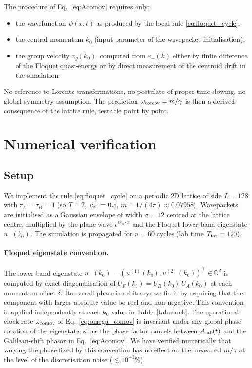 \documentclass[11pt,a4paper]{article}
\begin{document}
The procedure of Eq.~\eqref{eq:Acomov} requires only:
\begin{itemize}
\item the wavefunction $\psi(x, t)$ as produced by the local
rule \eqref{eq:floquet_cycle},
\item the central momentum $k_0$ (input parameter of the
wavepacket initialisation),
\item the group velocity $v_g(k_0)$, computed from
$\varepsilon_-(k)$ either by finite difference of the Floquet
quasi-energy or by direct measurement of the centroid drift in
the simulation.
\end{itemize}
No reference to Lorentz transformations, no postulate of
proper-time slowing, no global symmetry assumption. The
prediction $\omega_{\rm comov} = m/\gamma$ is then a derived
consequence of the lattice rule, testable point by point.

\section{Numerical verification}
\label{sec:numerical}

\subsection{Setup}

We implement the rule \eqref{eq:floquet_cycle} on a periodic
2D lattice of side $L = 128$ with $\tau_A = \tau_B = 1$ (so
$T = 2$, $c_{\rm eff} = 0.5$, $m = 1/(4\pi) \approx 0.07958$).
Wavepackets are initialised as a Gaussian envelope of width
$\sigma = 12$ centred at the lattice centre, multiplied by the
plane wave $e^{i k_0 \cdot x}$ and the Floquet lower-band
eigenstate $u_-(k_0)$. The simulation is propagated for
$n = 60$ cycles (lab time $T_{\rm tot} = 120$).

\paragraph{Floquet eigenstate convention.}
The lower-band eigenstate $u_-(k_0) = (u_-^{(1)}(k_0),
u_-^{(2)}(k_0))^\top \in \mathbb{C}^2$ is computed by exact
diagonalisation of $U_F(k_0) = U_B(k_0)\,U_A(k_0)$ at each
momentum offset $\delta$. Its overall phase is arbitrary; we
fix it by requiring that the component with larger absolute
value be real and non-negative. This convention is applied
independently at each $k_0$ value in
Table~\ref{tab:clock}. The operational clock rate
$\omega_{\rm comov}$ of Eq.~\eqref{eq:omega_comov} is invariant
under any global phase rotation of the eigenstate, since the
phase factor cancels between $A_{\rm lab}(t)$ and the
Galilean-shift phasor in Eq.~\eqref{eq:Acomov}. We have
verified numerically that varying the phase fixed by this
convention has no effect on the measured $m/\gamma$ at the
level of the discretisation noise ($\lesssim 10^{-3}\%$).
\end{document}
